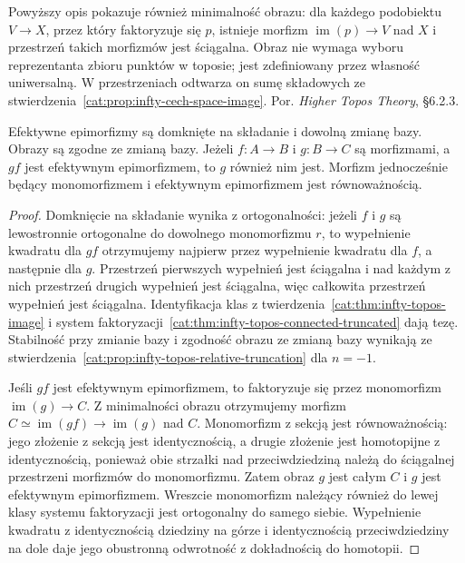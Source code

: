 Powyższy opis pokazuje również minimalność obrazu: dla każdego podobiektu $V\to X$, przez który faktoryzuje się $p$, istnieje morfizm $\operatorname{im}(p)\to V$ nad $X$ i przestrzeń takich morfizmów jest ściągalna. Obraz nie wymaga wyboru reprezentanta zbioru punktów w toposie; jest zdefiniowany przez własność uniwersalną. W przestrzeniach odtwarza on sumę składowych ze stwierdzenia~\ref{cat:prop:infty-cech-space-image}. Por. \emph{Higher Topos Theory}, \S6.2.3.

\begin{wniosek}\label{cat:cor:infty-topos-effective-epi-laws}
Efektywne epimorfizmy są domknięte na składanie i dowolną zmianę bazy. Obrazy są zgodne ze zmianą bazy. Jeżeli $f:A\to B$ i $g:B\to C$ są morfizmami, a $gf$ jest efektywnym epimorfizmem, to $g$ również nim jest. Morfizm jednocześnie będący monomorfizmem i efektywnym epimorfizmem jest równoważnością.
\end{wniosek}
\begin{proof}
Domknięcie na składanie wynika z ortogonalności: jeżeli $f$ i $g$ są lewostronnie ortogonalne do dowolnego monomorfizmu $r$, to wypełnienie kwadratu dla $gf$ otrzymujemy najpierw przez wypełnienie kwadratu dla $f$, a następnie dla $g$. Przestrzeń pierwszych wypełnień jest ściągalna i nad każdym z nich przestrzeń drugich wypełnień jest ściągalna, więc całkowita przestrzeń wypełnień jest ściągalna. Identyfikacja klas z twierdzenia~\ref{cat:thm:infty-topos-image} i system faktoryzacji~\ref{cat:thm:infty-topos-connected-truncated} dają tezę. Stabilność przy zmianie bazy i zgodność obrazu ze zmianą bazy wynikają ze stwierdzenia~\ref{cat:prop:infty-topos-relative-truncation} dla $n=-1$.

Jeśli $gf$ jest efektywnym epimorfizmem, to faktoryzuje się przez monomorfizm $\operatorname{im}(g)\to C$. Z minimalności obrazu otrzymujemy morfizm $C\simeq\operatorname{im}(gf)\to\operatorname{im}(g)$ nad $C$. Monomorfizm z sekcją jest równoważnością: jego złożenie z sekcją jest identycznością, a drugie złożenie jest homotopijne z identycznością, ponieważ obie strzałki nad przeciwdziedziną należą do ściągalnej przestrzeni morfizmów do monomorfizmu. Zatem obraz $g$ jest całym $C$ i $g$ jest efektywnym epimorfizmem. Wreszcie monomorfizm należący również do lewej klasy systemu faktoryzacji jest ortogonalny do samego siebie. Wypełnienie kwadratu z identycznością dziedziny na górze i identycznością przeciwdziedziny na dole daje jego obustronną odwrotność z dokładnością do homotopii.
\end{proof}

